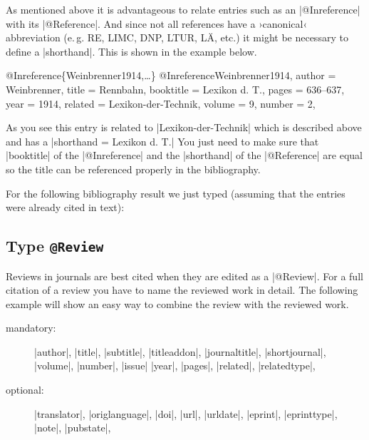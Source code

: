 \documentclass[a4paper,
10pt,
greek,
french,
spanish,
italian,
ngerman,
english
]{ltxdoc}
\begin{document}
As mentioned above it is  advantageous to relate entries such as  an |@Inreference| with its |@Reference|. 
And since not all references have a ›canonical‹ abbreviation (e.\,g. RE, LIMC, DNP, LTUR, LÄ, etc.) it might be necessary to define a |shorthand|.
This is shown in the example below.
 
\begin{bibexample}[label=Weinbrenner1914]{{@}Inreference\{Weinbrenner1914,…\}}
@Inreference{Weinbrenner1914,
  author    = {Weinbrenner},
  title     = {Rennbahn},
  booktitle = {Lexikon d. T.},
  pages     = {636--637},
  year      = {1914},
  related   = {Lexikon-der-Technik},
  volume    = {9},
  number    = {2},
}
\end{bibexample}
As you see this entry is related to |Lexikon-der-Technik| which is described above and has a |shorthand = {Lexikon d. T.}|
You just need to make sure that  |booktitle| of the |@Inreference| and the |shorthand| of 
the  |@Reference| are equal so the title can be referenced properly in the bibliography.

For the following bibliography result we just typed (assuming that the entries were already cited in text):

\begin{refsection}
\nocite{Lexikon-der-Technik,Weinbrenner1914,LTUR,Neils1994}
\setlength{\labwidthsameline}{5em} 
\begin{example}
\printbibliography[keyword=corpus,title={Corpora}]
\printbibliography[notkeyword=corpus]
\end{example}
\end{refsection}


 
\subsection{Type \texttt{@Review}}\label{review}
Reviews in journals are best cited when they are edited as a |@Review|.
For a full citation of a review you have to name the reviewed work in detail.
The following example will show an easy way to combine the review with the reviewed work.

\begin{description}
\item[mandatory:] 
|author|, |title|, |subtitle|, |titleaddon|,
|journaltitle|, |shortjournal|, |volume|, |number|, |issue|
|year|, |pages|, 
|related|, |relatedtype|,
\item[optional:]
|translator|, |origlanguage|,
|doi|, |url|, |urldate|, |eprint|, |eprinttype|, |note|, |pubstate|, 
 \end{description}
\end{document}
